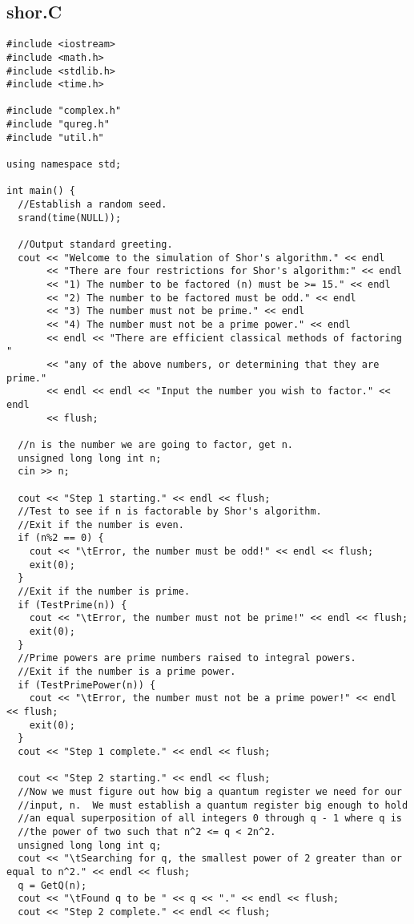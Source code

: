 \documentclass[]{article}
\begin{document}
\subsection{shor.C}
\begin{verbatim}
#include <iostream>
#include <math.h>
#include <stdlib.h>
#include <time.h>

#include "complex.h"
#include "qureg.h"
#include "util.h"

using namespace std;

int main() {
  //Establish a random seed.
  srand(time(NULL));

  //Output standard greeting.
  cout << "Welcome to the simulation of Shor's algorithm." << endl
       << "There are four restrictions for Shor's algorithm:" << endl
       << "1) The number to be factored (n) must be >= 15." << endl
       << "2) The number to be factored must be odd." << endl
       << "3) The number must not be prime." << endl
       << "4) The number must not be a prime power." << endl
       << endl << "There are efficient classical methods of factoring "
       << "any of the above numbers, or determining that they are prime."
       << endl << endl << "Input the number you wish to factor." << endl
       << flush;

  //n is the number we are going to factor, get n.
  unsigned long long int n;
  cin >> n;

  cout << "Step 1 starting." << endl << flush;
  //Test to see if n is factorable by Shor's algorithm.
  //Exit if the number is even.
  if (n%2 == 0) {
    cout << "\tError, the number must be odd!" << endl << flush;
    exit(0);
  } 
  //Exit if the number is prime.
  if (TestPrime(n)) {
    cout << "\tError, the number must not be prime!" << endl << flush;
    exit(0);
  }
  //Prime powers are prime numbers raised to integral powers.
  //Exit if the number is a prime power.
  if (TestPrimePower(n)) {
    cout << "\tError, the number must not be a prime power!" << endl << flush;
    exit(0);
  }
  cout << "Step 1 complete." << endl << flush;

  cout << "Step 2 starting." << endl << flush;
  //Now we must figure out how big a quantum register we need for our
  //input, n.  We must establish a quantum register big enough to hold
  //an equal superposition of all integers 0 through q - 1 where q is
  //the power of two such that n^2 <= q < 2n^2.
  unsigned long long int q;
  cout << "\tSearching for q, the smallest power of 2 greater than or equal to n^2." << endl << flush;
  q = GetQ(n);
  cout << "\tFound q to be " << q << "." << endl << flush;
  cout << "Step 2 complete." << endl << flush;


\end{verbatim}
\end{document}
